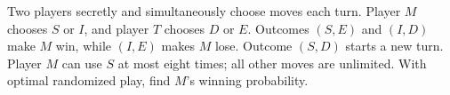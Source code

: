 Two players secretly and simultaneously choose moves each turn. Player $M$ chooses $S$ or $I$, and player $T$ chooses $D$ or $E$. Outcomes $(S,E)$ and $(I,D)$ make $M$ win, while $(I,E)$ makes $M$ lose. Outcome $(S,D)$ starts a new turn. Player $M$ can use $S$ at most eight times; all other moves are unlimited. With optimal randomized play, find $M$'s winning probability.
